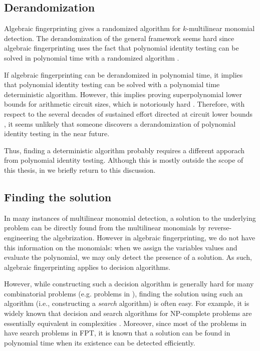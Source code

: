 \subsection{Derandomization}
\label{sect:derandomization}

Algebraic fingerprinting gives a randomized algorithm for $k$-multilinear monomial detection. 
The derandomization of the general framework seems hard since algebraic fingerprinting 
uses the fact that polynomial identity testing can be solved in polynomial time with 
a randomized algorithm \cite{Williams09}.

If algebraic fingerprinting can be derandomized 
in polynomial time, it implies that polynomial identity testing can be solved with a 
polynomial time deterministic algorithm. However, this
implies proving superpolynomial 
lower bounds for arithmetic circuit sizes, which is notoriously hard \cite{Kabanets03}. 
Therefore, with respect to the several decades of 
sustained effort directed at circuit lower bounds \cite{Kabanets03}, 
it seems unlikely that someone discovers a derandomization of polynomial identity testing 
in the near future.

Thus, finding a deterministic algorithm 
probably requires a different apporach from polynomial identity testing. 
Although this is mostly outside the scope of this thesis, 
in  we briefly return to this discussion.

\subsection{Finding the solution}
\label{sect:finding_the_solution}

In many instances of multilinear monomial detection, 
a solution to the underlying problem can be directly found 
from the multilinear monomials by 
reverse-engineering the algebrization. 
However in algebraic fingerprinting, we do not have this information on the monomials: 
when we assign the variables values and evaluate the polynomial, we may only detect the 
presence of a solution. As such, algebraic fingerprinting applies to decision algorithms.

However, while constructing such a decision algorithm is generally hard for 
many combinatorial problems (e.g. problems in ), 
finding the solution using such an algorithm 
(i.e., constructing a \emph{search} algorithm) is often easy. 
For example, it is widely known that decision and search algorithms 
for NP-complete problems are essentially equivalent in complexities \cite{Bellare94}. 
Moreover, since most of the problems in  
have search problems in FPT, it is known that a solution can be found in polynomial time when its 
existence can be detected efficiently.

